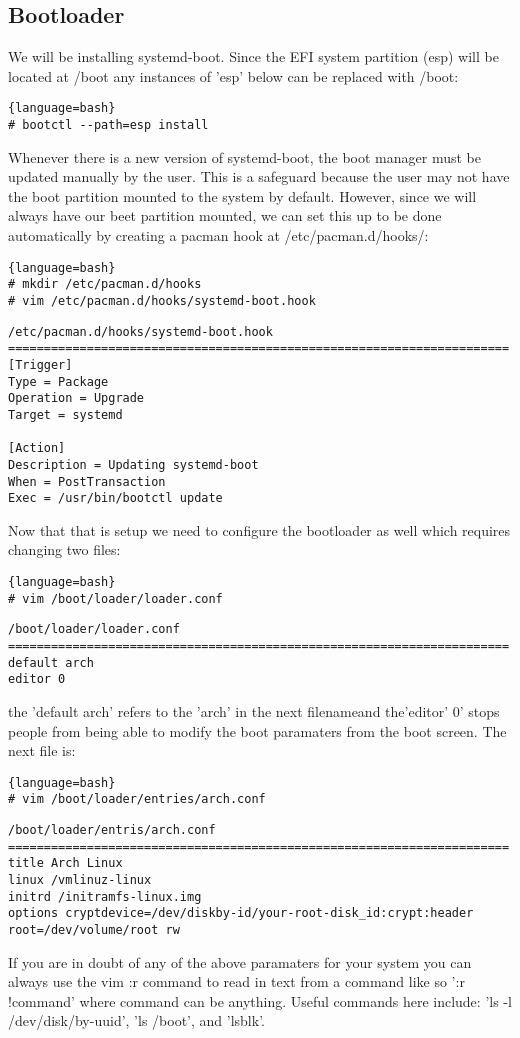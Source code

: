 \subsection{Bootloader}
We will be installing systemd-boot.
Since the EFI system partition (esp) will be located at /boot any instances of 'esp' below can be replaced with /boot:
\begin{lstlisting}{language=bash}
# bootctl --path=esp install
\end{lstlisting}
Whenever there is a new version of systemd-boot, the boot manager must be updated manually by the user. This is a safeguard because the user may not have the boot partition mounted to the system by default. However, since we will always have our beet partition mounted, we can set this up to be done automatically by creating a pacman hook at /etc/pacman.d/hooks/:
\begin{lstlisting}{language=bash}
# mkdir /etc/pacman.d/hooks
# vim /etc/pacman.d/hooks/systemd-boot.hook
\end{lstlisting}
\begin{verbatim}
/etc/pacman.d/hooks/systemd-boot.hook
======================================================================
[Trigger]
Type = Package
Operation = Upgrade
Target = systemd

[Action]
Description = Updating systemd-boot
When = PostTransaction
Exec = /usr/bin/bootctl update
\end{verbatim}
Now that that is setup we need to configure the bootloader as well which requires changing two files:
\begin{lstlisting}{language=bash}
# vim /boot/loader/loader.conf
\end{lstlisting}
\begin{verbatim}
/boot/loader/loader.conf
======================================================================
default arch
editor 0
\end{verbatim}
the 'default arch' refers to the 'arch' in the next filenameand the'editor' 0' stops people from being able to modify the boot paramaters from the boot screen. The next file is:
\begin{lstlisting}{language=bash}
# vim /boot/loader/entries/arch.conf
\end{lstlisting}
\begin{verbatim}
/boot/loader/entris/arch.conf
======================================================================
title Arch Linux
linux /vmlinuz-linux
initrd /initramfs-linux.img
options cryptdevice=/dev/diskby-id/your-root-disk_id:crypt:header root=/dev/volume/root rw
\end{verbatim}
If you are in doubt of any of the above paramaters for your system you can always use the vim :r command to read in text from a command like so ':r !command' where command can be anything. Useful commands here include: 'ls -l /dev/disk/by-uuid', 'ls /boot', and 'lsblk'.

